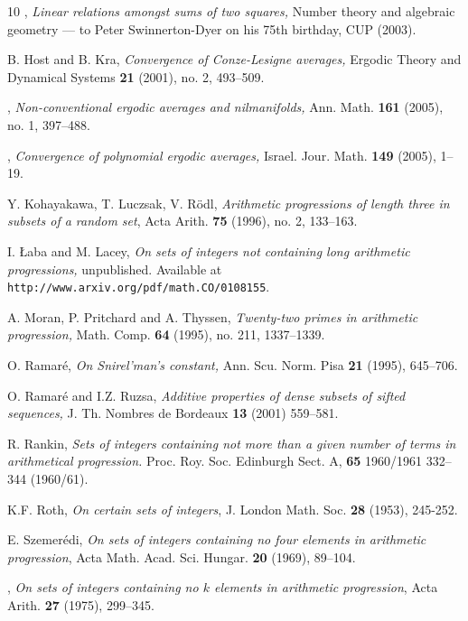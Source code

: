 \documentclass[12pt,a4paper,reqno]{amsart}
\numberwithin{equation}{section}
\theoremstyle{plain}
\theoremstyle{definition}
\def\emph#1{{\it #1}}
\def\textbf#1{{\bf #1}}
\begin{document}
\begin{thebibliography}{10}
\bysame, \emph{Linear relations amongst sums of two squares,} Number theory and algebraic geometry --- to Peter Swinnerton-Dyer on his 75th birthday, CUP (2003). 

 B. Host and B. Kra, \emph{Convergence of Conze-Lesigne averages,} Ergodic Theory and Dynamical Systems \textbf{21} (2001), no. 2, 493--509.

\bysame, \emph{Non-conventional ergodic averages and nilmanifolds,} Ann. Math. \textbf{161} (2005), no. 1, 397--488.

 \bysame, \emph{Convergence of polynomial ergodic averages,} Israel. Jour. Math. \textbf{149} (2005), 1--19.

Y. Kohayakawa, T. Luczsak, V. R\"odl, \emph{Arithmetic progressions of length three in subsets of a random set}, 
Acta Arith. \textbf{75} (1996), no. 2, 133--163.

 I. {\L}aba and M. Lacey, \emph{On sets of integers not containing long arithmetic progressions,} unpublished. Available at
\texttt{http://www.arxiv.org/pdf/math.CO/0108155}.

 A. Moran, P. Pritchard and A. Thyssen, \emph{Twenty-two primes in arithmetic progression,} Math. Comp. \textbf{64} (1995), no. 211, 1337--1339.

 O. Ramar\'e, \emph{On Snirel'man's constant,} Ann. Scu. Norm. Pisa \textbf{21} (1995), 645--706.

 O. Ramar\'e and I.Z. Ruzsa, \emph{Additive properties of dense subsets of sifted sequences,} J. Th. Nombres de Bordeaux \textbf{13} (2001) 559--581.

 R. Rankin, \emph{Sets of integers containing not more than a given number of terms in arithmetical 
progression.} Proc. Roy. Soc. Edinburgh Sect. A, \textbf{65} 1960/1961 332--344 (1960/61).

K.F. Roth, \emph{On certain sets of integers}, J. London Math. Soc. \textbf{28} (1953), 245-252.

E. Szemer\'edi, \emph{On sets of integers containing no four elements in arithmetic progression},
Acta Math. Acad. Sci. Hungar. \textbf{20} (1969), 89--104.

\bysame, \emph{On sets of integers containing no $k$ elements in arithmetic progression},
Acta Arith. \textbf{27} (1975), 299--345.


\end{thebibliography}
\end{document}
